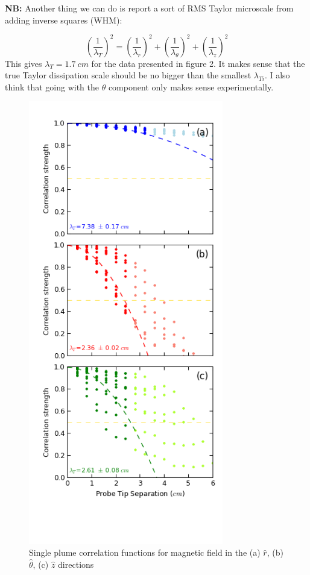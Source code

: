 \documentclass[aip,prl,amsmath,amssymb,reprint,superscriptaddress]{revtex4-1} %
\begin{document}
{\bf NB:} Another thing we can do is report a sort of RMS Taylor microscale from adding inverse squares (WHM):

$$\left( \frac{1}{\lambda_T} \right)^2  = \left( \frac{1}{\lambda_r} \right)^2 + \left( \frac{1}{\lambda_{\theta}} \right)^2 + \left( \frac{1}{\lambda_z} \right)^2 $$  This gives $\lambda_T = 1.7~cm$ for the data presented in figure 2.  It makes sense that the true Taylor dissipation scale should be no bigger than the smallest $\lambda_{Ti}$.  I also think that going with the $\theta$ component only makes sense experimentally.

\begin{figure}[!htbp]
\centerline{
\includegraphics[width=8.5cm]{Images/brbtbz-081413.png}}
\caption{Single plume correlation functions for magnetic field in the (a) $\hat{r}$, (b) $\hat{\theta}$, (c) $\hat{z}$ directions}
\label{fig:brbtbz}
\end{figure}
\end{document}
